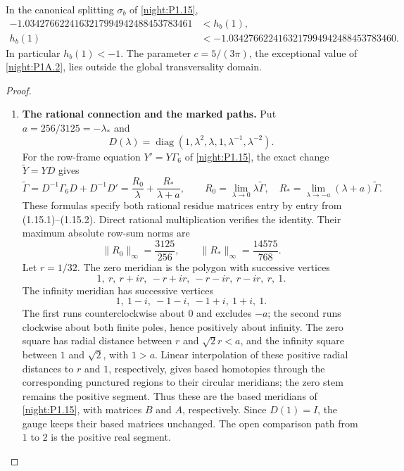 \begin{theorem}\hypertarget{tag-02QP}{}\label{night:P1.16}
In the canonical splitting $\sigma_b$ of \cref{night:P1.15},
\[
\begin{aligned}
-1.0342766224163217994942488453783461&<h_b(1),\\
h_b(1)&<-1.0342766224163217994942488453783460.
\end{aligned}
\]
In particular $h_b(1)<-1$.  The parameter $c=5/(3\pi)$, the exceptional value of \cref{night:P1A.2}, lies outside the global transversality domain.  
\end{theorem}
\begin{proof}
\begin{enumerate}[label={$\langle1\rangle$\arabic*.}]
\item \textbf{The rational connection and the marked paths.}
Put $a=256/3125=-\lambda_*$ and
\[
 D(\lambda)=\operatorname{diag}(1,\lambda^2,\lambda,1,
                              \lambda^{-1},\lambda^{-2}).
\]
For the row-frame equation $Y'=Y\Gamma_6$ of \cref{night:P1.15}, the exact
change $\widetilde Y=YD$ gives
\[
 \widetilde\Gamma
 =D^{-1}\Gamma_6D+D^{-1}D'
 =\frac{R_0}{\lambda}+\frac{R_*}{\lambda+a},\qquad
 R_0=\lim_{\lambda\to0}\lambda\widetilde\Gamma,
 \quad R_*=\lim_{\lambda\to-a}(\lambda+a)\widetilde\Gamma.
\]
These formulas specify both rational residue matrices entry by entry
from (1.15.1)--(1.15.2).  Direct rational multiplication verifies the
identity.  Their maximum absolute row-sum norms are
\[
 \|R_0\|_\infty=\frac{3125}{256},\qquad
 \|R_*\|_\infty=\frac{14575}{768}.
\]
Let $r=1/32$.  The zero meridian is the polygon with successive
vertices
\[
 1,\ r,\ r+ir,\ -r+ir,\ -r-ir,\ r-ir,\ r,\ 1.
\]
The infinity meridian has successive vertices
\[
 1,\ 1-i,\ -1-i,\ -1+i,\ 1+i,\ 1.
\]
The first runs counterclockwise about $0$ and excludes $-a$; the
second runs clockwise about both finite poles, hence positively
about infinity.  The zero square has radial distance between $r$
and $\sqrt2r<a$, and the infinity square between $1$ and $\sqrt2$,
with $1>a$.  Linear interpolation of these positive radial distances
to $r$ and $1$, respectively, gives based homotopies through the
corresponding punctured regions to their circular meridians; the
zero stem remains the positive segment.  Thus these are the based meridians of \cref{night:P1.15}, with matrices $B$ and $A$, respectively.
Since $D(1)=I$, the gauge
keeps their based matrices unchanged.  The open comparison path
from $1$ to $2$ is the positive real segment.


\end{enumerate}
\end{proof}
